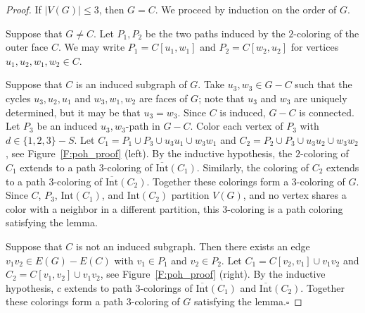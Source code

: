\documentclass[12pt,letterpaper]{article}
\newcommand{\graphinto}{\text{Int}}
\newcommand{\graphintc}{\overline{\text{Int}}}
\theoremstyle{plain}
\theoremstyle{definition}
\theoremstyle{break}
\newcommand{\ggcqedsymbol}{$\square$}
\newcommand{\ggcqed}{\hbox{}\nobreak\hbox{\quad\ggcqedsymbol}}
\newcommand{\ggcnopf}{\ggcqed}
\begin{document}
\begin{proof}
If $|V(G)|\le 3$, then $G=C$. We proceed by induction on the order of $G$. 

Suppose that $G\ne C$. Let $P_1,P_2$ be the two paths induced by the $2$-coloring
of the outer face
$C$. We may write $P_1=C[u_1,w_1]$ and $P_2=C[w_2,u_2]$ for vertices
$u_1,u_2,w_1,w_2\in C$.

Suppose that $C$ is an induced subgraph of $G$. Take
$u_3,w_3\in G-C$ such that the cycles
$u_3,u_2,u_1$ and $w_3,w_1,w_2$ are faces of $G$; note that
$u_3$ and $w_3$ are uniquely determined, but it may be that $u_3=w_3$. Since
$C$ is induced, $G-C$ is connected.
Let $P_3$ be an induced $u_3,w_3$-path in $G-C$.
Color each vertex of $P_3$ with $d\in\{1,2,3\}- S$.
Let $C_1=P_1\cup P_3\cup u_3u_1\cup w_3w_1$ and
$C_2=P_2\cup P_3\cup u_3u_2\cup w_3w_2$, see Figure~\ref{F:poh_proof} (left).
By the inductive hypothesis, the $2$-coloring of $C_1$ extends to a path
$3$-coloring of $\graphintc(C_1)$. Similarly, the coloring of $C_2$ extends to
a path $3$-coloring of $\graphintc(C_2)$.
Together these colorings form a $3$-coloring of $G$.
Since $C$, $P_3$, $\graphinto(C_1)$, and $\graphinto(C_2)$ partition $V(G)$, and no
vertex shares a color with a neighbor in a different partition,
this $3$-coloring is a path coloring satisfying the lemma.

Suppose that $C$ is not an induced subgraph. Then there
exists an edge $v_1v_2\in E(G)- E(C)$ with $v_1\in P_1$ and
$v_2\in P_2$. Let $C_1=C[v_2,v_1]\cup v_1v_2$
and $C_2=C[v_1,v_2]\cup v_1v_2$, see Figure~\ref{F:poh_proof} (right).
By the inductive hypothesis, $c$ extends to path
$3$-colorings of $\graphintc(C_1)$ and $\graphintc(C_2)$.
Together these colorings form a path $3$-coloring of $G$ satisfying the lemma.\ggcnopf
\end{proof}
\end{document}
